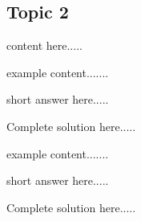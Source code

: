 \subsection*{Topic 2}
content here.....
\begin{example}
example content.......
    \begin{sol}
    short answer here.....
    \end{sol}
    \begin{solL}
    Complete solution here.....
    
    \end{solL}
    
\end{example}
\vspace{0.6in}
\begin{example}
example content.......
    \begin{sol}
    short answer here.....
    \end{sol}
    \begin{solL}
    Complete solution here.....
    
    \end{solL}
    
\end{example}
\vspace{0.6in}







